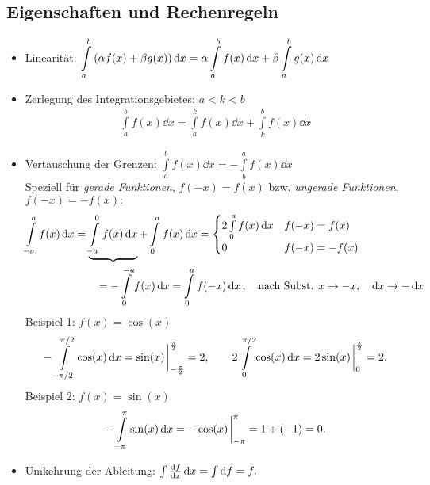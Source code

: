 \subsection{Eigenschaften und Rechenregeln}

\begin{itemize}
    \item Linearität: $\displaystyle \int\limits_{a}^{b} \qty(\alpha f(x)+\beta g(x)) \dd{x} = \alpha \int\limits_{a}^{b} f(x) \dd{x} + \beta \int\limits_{a}^{b} g(x) \dd{x}$ 
    \item Zerlegung des Integrationsgebietes: $a < k < b$ 
    \begin{align}
        \int\limits_{a}^{b} f(x) \dd{x} = \int\limits_{a}^{k} f(x) \dd{x} + \int\limits_{k}^{b} f(x) \dd{x}
    \end{align}
    \item Vertauschung der Grenzen: $\displaystyle \int\limits_{a}^{b} f(x) \dd{x} = - \int\limits_{b}^{a}f(x) \dd{x}$\\
    Speziell für \emph{gerade Funktionen}, $f(-x) = f(x)$ bzw. \emph{ungerade Funktionen}, $f(-x) = -f(x):$
    \begin{align}
        \int\limits_{-a}^{a} f(x) \dd{x} &= \underbrace{\int\limits_{-a}^{0}f(x) \dd{x}} + \int\limits_{0}^{a} f(x) \dd{x} = \begin{cases}
            2 \int\limits_{0}^{a} f(x) \dd{x} & f(-x) = f(x)\\ 0 & f(-x) = -f(x)
        \end{cases} \\
        & \qquad = -\int\limits_{0}^{-a} f(x) \dd{x} = \int\limits_{0}^{a} f(-x) \dd{x}, \quad \text{nach Subst. } x \to -x, \quad \dd{x} \to -\dd{x} \notag 
    \end{align}
    Beispiel 1: $f(x) = \cos (x)$ 
    \begin{align}
        -\int\limits_{-\pi/2}^{\pi/2} \cos(x) \dd{x} = \sin(x)\eval_{-\frac{\pi}{2}}^{\frac{\pi}{2}}= 2,   \qquad 2 \int\limits_{0}^{\pi/2} \cos(x)\dd{x} = 2 \sin(x)\eval_0^{\frac{\pi}{2}} = 2.
    \end{align}
    Beispiel 2: $f(x) = \sin (x)$ \vspace{-4mm}
    \begin{align}
        -\int\limits_{-\pi}^{\pi} \sin(x) \dd{x} = -\cos(x)\eval_{-\pi}^{\pi} = 1+(-1) = 0.
    \end{align}
    \item Umkehrung der Ableitung: $\int \dv{f}{x} \dd{x} = \int \dd{f} = f.$
\end{itemize}

